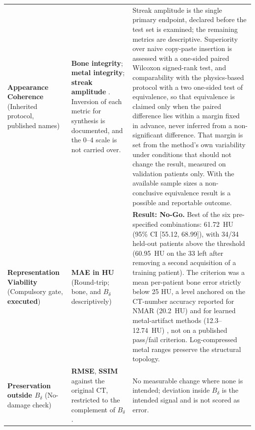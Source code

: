 \documentclass[9pt]{extarticle}
\begin{document}
\begin{table}[h]
\begin{tabularx}{\linewidth}{@{}p{3cm} p{4cm} X@{}}
\textbf{Appearance Coherence} \newline (Inherited protocol, published names) & \textbf{Bone integrity}; \textbf{metal integrity}; \textbf{streak amplitude} \citep{peters2025hybrid}. Inversion of each metric for synthesis is documented, and the 0--4 scale is not carried over. & Streak amplitude is the single primary endpoint, declared before the test set is examined; the remaining metrics are descriptive. Superiority over naive copy-paste insertion is assessed with a one-sided paired Wilcoxon signed-rank test, and comparability with the physics-based protocol with a two one-sided test of equivalence, so that equivalence is claimed only when the paired difference lies within a margin fixed in advance, never inferred from a non-significant difference. That margin is set from the method's own variability under conditions that should not change the result, measured on validation patients only. With the available sample sizes a non-conclusive equivalence result is a possible and reportable outcome. \\
\addlinespace[4pt]
\textbf{Representation Viability} \newline (Compulsory gate, \textbf{executed}) & \textbf{MAE in HU} (Round-trip; bone, and $B_{\delta}$ descriptively) & \textbf{Result: No-Go.} Best of the six pre-specified combinations: 61.72~HU (95\% CI [55.12, 68.99]), with 34/34 held-out patients above the threshold (60.95~HU on the 33 left after removing a second acquisition of a training patient). The criterion was a mean per-patient bone error strictly below 25 HU, a level anchored on the CT-number accuracy reported for NMAR (20.2~HU) and for learned metal-artifact methods (12.3--12.74~HU) \citep{karageorgos2024ddpm,yun2026simulationdriven}, not on a published pass/fail criterion. Log-compressed metal ranges preserve the structural topology. \\
\addlinespace[4pt]
\textbf{Preservation outside $B_{\delta}$} \newline (No-damage check) & \textbf{RMSE}, \textbf{SSIM} against the original CT, restricted to the complement of $B_{\delta}$. & No measurable change where none is intended; deviation inside $B_{\delta}$ is the intended signal and is not scored as error. \\
\bottomrule
\end{tabularx}
\end{table}
\end{document}
